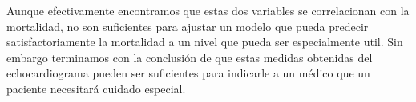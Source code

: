 \documentclass[11pt]{article}
\begin{document}
Aunque efectivamente encontramos que estas dos variables se
correlacionan con la mortalidad, no son suficientes para ajustar un
modelo que pueda predecir satisfactoriamente la mortalidad a un nivel
que pueda ser especialmente util. Sin embargo terminamos con la
conclusión de que estas medidas obtenidas del echocardiograma pueden ser
suficientes para indicarle a un médico que un paciente necesitará
cuidado especial.


    
    
    
    
\end{document}
